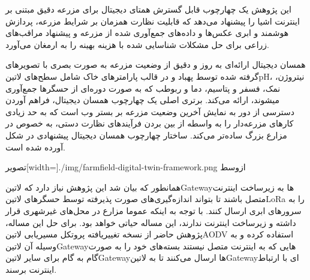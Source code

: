 این پژوهش یک چهارچوب قابل گسترش همتای دیجیتال برای مزرعه دقیق مبتنی بر اینترنت اشیا را پیشنهاد می‌دهد که قابلیت نظارت همزمان بر شرایط مزرعه،
پردازش هوشمند و ابری عکس‌ها و داده‌های جمع‌آوری شده از مزرعه و پیشنهاد مراقب‌های زراعی برای حل مشکلات شناسایی شده با هزینه بهینه را به ارمغان
می‌آورد.

همسان دیجیتال ارائه‌‌ای به روز و دقیق از وضعیت مزرعه به صورت بصری با تصویرهای گرفته شده توسط پهباد و در قالب پارامترهای خاک شامل سطح‌های ‌لاتین{pH}،
نیتروژن، نمک، فسفر و پتاسیم، دما و ربوطب که به صورت دوره‌ای از حسگرها جمع‌آوری میشوند، ارائه می‌کند.
برتری اصلی یک چهارچوب همسان دیجیتال، فراهم آوردن دسترسی از دور به نمایش آخرین وضعیت مزرعه بر بستر وب است که به حد زیادی کارهای مزرعه‌دار را
به واسطه از بین بردن فرآیندهای نظارت دستی، به خصوص در مزارع بزرگ ساده‌تر می‌کند.
ساختار چهارچوب همسان دیجیتال پیشنهادی در شکل  آورده شده است.

‌تصویر[width=\textwidth]{./img/farmfield-digital-twin-framework.png}
‌ازوسط

همانطور که بیان شد این پژوهش نیاز دارد که ‌لاتین{Gateway}ها به زیرساخت اینترنت متصل باشند تا بتواند اندازه‌گیری‌های صورت پذیرفته توسط حسگرهای ‌لاتین{LoRa} را
به سرورهای ابری ارسال کنند. با توجه به اینکه عموما مزارع در محل‌های غیرشهری قرار داشته و زیرساخت اینترنت ندارند، این مساله حیاتی خواهد بود.
برای حل این مساله، پژوهش حاضر از نسخه تغییریافته پروتکل مسیریابی ‌لاتین{AODV} استفاده کرده و به وسیله آن ‌لاتین{Gateway}هایی که به اینترنت متصل نیستند بسته‌های خود
را به صورت گام به گام برای سایر ‌لاتین{Gateway}ها ارسال می‌کنند تا به ‌لاتین{Gateway}ای با ارتباط اینترنت برسند.
